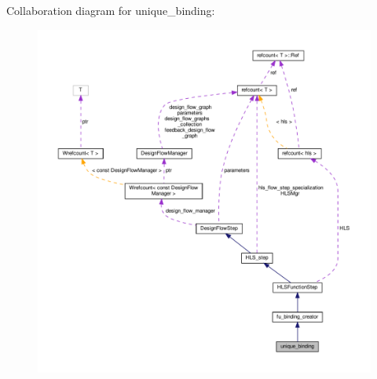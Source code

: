 Collaboration diagram for unique\+\_\+binding\+:
\nopagebreak
\begin{figure}[H]
\begin{center}
\leavevmode
\includegraphics[width=350pt]{d7/d02/classunique__binding__coll__graph}
\end{center}
\end{figure}
